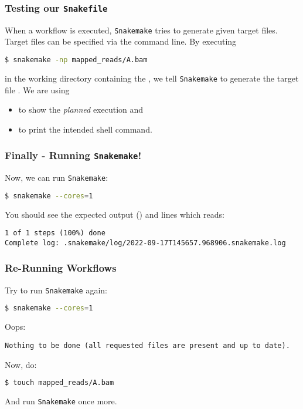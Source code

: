 \begin{frame}[fragile]
  \frametitle{Testing our \texttt{Snakefile}}
  When a workflow is executed, \texttt{Snakemake} tries to generate given target files. Target files can be specified via the command line. By executing
  \begin{lstlisting}[language=Bash, style=Shell]
$ snakemake -np mapped_reads/A.bam
  \end{lstlisting}
  in the working directory containing the , we tell \texttt{Snakemake} to generate the target file .\newline
  We are using 
  \begin{itemize}[<+->]
   \item {} to show the \emph{planned} execution and
   \item {} to print the intended shell command.
  \end{itemize} 
\end{frame}

\begin{frame}[fragile]
  \frametitle{Finally - Running \texttt{Snakemake}!}
  Now, we can run \texttt{Snakemake}:
  \begin{lstlisting}[language=Bash, style=Shell]
$ snakemake --cores=1
  \end{lstlisting}
  You should see the expected output () and lines which reads:
  \begin{lstlisting}[style=Plain, basicstyle=\footnotesize]
1 of 1 steps (100%) done
Complete log: .snakemake/log/2022-09-17T145657.968906.snakemake.log
  \end{lstlisting}
\end{frame}

\begin{frame}[fragile]
  \frametitle{Re-Running Workflows}
  Try to run \texttt{Snakemake} again:
  \begin{lstlisting}[language=Bash, style=Shell]
$ snakemake --cores=1
  \end{lstlisting}
  \pause
  Oops:
  \begin{lstlisting}[style=Plain, basicstyle=\footnotesize]
Nothing to be done (all requested files are present and up to date).
  \end{lstlisting}
  \pause
  Now, do:
  \begin{lstlisting}[language=Bash, style=Shell]
$ touch mapped_reads/A.bam
  \end{lstlisting}
  And run \texttt{Snakemake} once more.
\end{frame}


